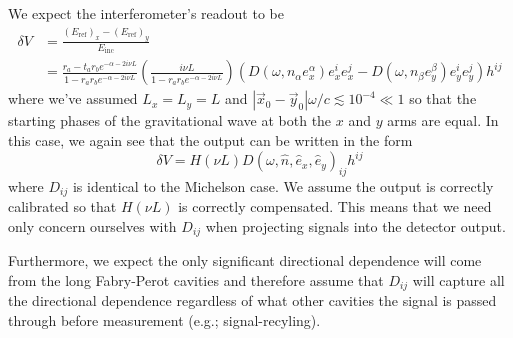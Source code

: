 \documentclass{article}
\begin{document}
We expect the interferometer's readout to be
\begin{align}
    \delta V & = \frac{\left(E_\mathrm{ref}\right)_x - \left(E_\mathrm{ref}\right)_y}{E_\mathrm{inc}} \\
             & = \frac{r_a - t_a r_b e^{-\alpha -2i\nu L}}{1 - r_a r_b e^{-\alpha-2i\nu L}}\left(\frac{i\nu L}{1 - r_a r_b e^{-\alpha-2i\nu L}}\right)\left( D(\omega, n_\alpha e_x^\alpha) e_x^i e_x^j - D(\omega, n_\beta e_y^\beta) e_y^i e_y^j \right) h^{ij}
\end{align}
where we've assumed $L_x=L_y=L$ and $|\vec{x}_0 - \vec{y}_0|\omega/c \lesssim 10^{-4} \ll 1$ so that the starting phases of the gravitational wave at both the $x$ and $y$ arms are equal. 
In this case, we again see that the output can be written in the form
\begin{equation}
    \delta V = H(\nu L) D(\omega, \hat{n}, \hat{e}_x, \hat{e}_y)_{ij} h^{ij}
\end{equation}
where $D_{ij}$ is identical to the Michelson case. 
We assume the output is correctly calibrated so that $H(\nu L)$ is correctly compensated.
This means that we need only concern ourselves with $D_{ij}$ when projecting signals into the detector output.

Furthermore, we expect the only significant directional dependence will come from the long Fabry-Perot cavities and therefore assume that $D_{ij}$ will capture all the directional dependence regardless of what other cavities the signal is passed through before measurement (e.g.; signal-recyling).

\end{document}

